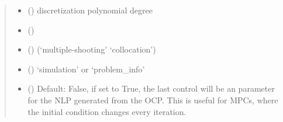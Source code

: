 \documentclass[letterpaper,10pt,english]{sphinxmanual}
\begin{document}
\begin{fulllineitems}
\begin{fulllineitems}
\begin{quote}
\begin{description}
\begin{itemize}
\item {} 
 () \textendash{} discretization polynomial degree

\item {} 
 () \textendash{} 

\item {} 
 () \textendash{} (‘multiple-shooting’ \textbar{} ‘collocation’)

\item {} 
 () \textendash{} ‘simulation’ or ‘problem\_info’

\item {} 
 () \textendash{} Default: False, if set to True, the last control will be an
parameter for the NLP generated from the OCP. This is useful for MPCs, where the initial condition changes
every iteration.

\end{itemize}

\end{description}\end{quote}

\end{fulllineitems}


\begin{fulllineitems}
\label{\detokenize{yaocptool.methods:yaocptool.methods.augmented_lagrangian.AugmentedLagrangian.create_nu_initial_guess}}
\end{fulllineitems}


\begin{fulllineitems}
\label{\detokenize{yaocptool.methods:yaocptool.methods.augmented_lagrangian.AugmentedLagrangian.create_optimization_result}}
\end{fulllineitems}


\end{fulllineitems}
\end{document}
